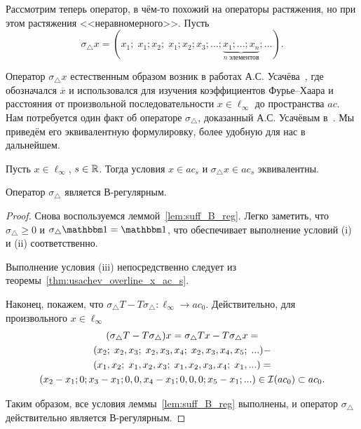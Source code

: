 Рассмотрим теперь оператор,
в чём-то похожий на операторы растяжения,
но при этом растяжения <<неравномерного>>.
Пусть
\begin{equation}
	\sigma_\triangle x =
	(x_1; \; x_1; x_2; \; x_1; x_2; x_3; ... ; \underbrace{x_1; ...; x_n}_{n~\mbox{элементов}}; ...)
	.
\end{equation}

	Оператор $\sigma_\triangle x$ естественным образом возник в работах А.С. Усачёва~\cite{usachev2009_phd_vsu},
	где обозначался $\overline{x}$ и
	использовался для изучения коэффициентов Фурье--Хаара
	и расстояния от произвольной последовательности $x\in\ell_\infty$
	до пространства $ac$.
Нам потребуется один факт об операторе $\sigma_\triangle$,
доказанный А.С. Усачёвым в~\cite[теорема 19]{usachev2009_phd_vsu}.
Мы приведём его эквивалентную формулировку, более удобную для нас в дальнейшем.

\begin{theorem}
	\label{thm:usachev_overline_x_ac_s}
	Пусть $x\in\ell_\infty$, $s\in\mathbb{R}$.
	Тогда условия $x\in ac_s$ и $\sigma_\triangle x \in ac_s$ эквивалентны.
\end{theorem}

\begin{proposition}
	Оператор $\sigma_\triangle$ является В-регулярным.
\end{proposition}

\begin{proof}
	Снова воспользуемся леммой~\ref{lem:suff_B_reg}.
	Легко заметить, что $\sigma_\triangle \geq 0$ и $\sigma_\triangle \one  = \one$,
	что обеспечивает выполнение условий (i) и (ii) соответственно.

	Выполнение условия (iii) непосредственно следует из теоремы~\ref{thm:usachev_overline_x_ac_s}.

	Наконец, покажем, что $\sigma_\triangle T - T \sigma_\triangle  : \ell_\infty \to ac_0$.
	Действительно, для произвольного $x\in\ell_\infty$
	\begin{multline}
	(\sigma_\triangle T - T \sigma_\triangle)x =
	\sigma_\triangle Tx - T \sigma_\triangle x =
	\\
	(x_2; \; x_2, x_3; \; x_2, x_3,   x_4; \; x_2, x_3, x_4, x_5; \; ... )-
	\\
	(x_1, x_2; \; x_1,    x_2, x_3; \; x_1,   x_2, x_3, x_4; \; x_1, ... )=
	\\
	(x_2-x_1; 0; x_3-x_1; 0, 0, x_4-x_1; 0,0,0; x_5-x_1; ...) \in\mathcal{I}(ac_0)\subset ac_0
	.
	\end{multline}

	Таким образом, все условия леммы~\ref{lem:suff_B_reg} выполнены,
	и оператор $\sigma_\triangle$ действительно является В-регулярным.
\end{proof}

